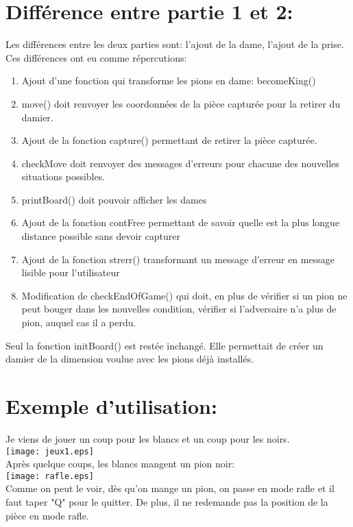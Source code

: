 \documentclass[10pt,a4paper]{report}
\begin{document}
\chapter*{Différence entre partie 1 et 2:}
Les différences entre les deux parties sont: l'ajout de la dame, l'ajout de la prise.\\
Ces différences ont eu comme répercutions:
\begin{enumerate}
\item Ajout d'une fonction qui transforme les pions en dame: becomeKing()
\item move() doit renvoyer les coordonnées de la pièce capturée pour la retirer du damier.
\item Ajout de la fonction capture() permettant de retirer la pièce capturée.
\item checkMove doit renvoyer des messages d'erreurs pour chacune des nouvelles situations possibles.
\item printBoard() doit pouvoir afficher les dames
\item Ajout de la fonction contFree permettant de savoir quelle est la plus longue distance possible sans devoir capturer
\item Ajout de la fonction strerr() transformant un message d'erreur en message lisible pour l'utilisateur
\item Modification de checkEndOfGame() qui doit, en plus de vérifier si un pion ne peut bouger dans les nouvelles condition, vérifier si l'adversaire n'a plus de pion, auquel cas il a perdu.
\end{enumerate}
Seul la fonction initBoard() est restée inchangé. Elle permettait de créer un damier de la dimension voulue avec les pions déjà installés.

\chapter*{Exemple d'utilisation:}
Je viens de jouer un coup pour les blancs et un coup pour les noirs.\\
\texttt{[image: jeux1.eps]}\\
Après quelque coups, les blancs mangent un pion noir:\\
\texttt{[image: rafle.eps]}\\
Comme on peut le voir, dès qu'on mange un pion, on passe en mode rafle et il faut taper "Q" pour le quitter. De plus, il ne redemande pas la position de la pièce en mode rafle.
\end{document}
